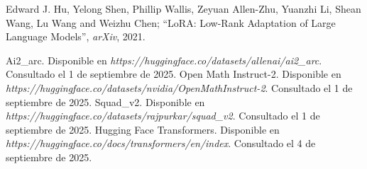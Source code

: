 \documentclass[11pt,a4paper]{article}
\begin{document}
\begin{thebibliography}{99}

 Edward J. Hu, Yelong Shen, Phillip Wallis, Zeyuan Allen-Zhu, Yuanzhi Li, Shean Wang, Lu Wang and Weizhu Chen; ``LoRA: Low-Rank Adaptation of Large Language Models'', {\it arXiv}, 2021.

 Ai2\_arc. Disponible en {\it https://huggingface.co/datasets/allenai/ai2\_arc}. Consultado el 1 de septiembre de 2025.
 Open Math Instruct-2. Disponible en {\it https://huggingface.co/datasets/nvidia/OpenMathInstruct-2}. Consultado el 1 de septiembre de 2025.
 Squad\_v2. Disponible en {\it https://huggingface.co/datasets/rajpurkar/squad\_v2}. Consultado el 1 de septiembre de 2025.
 Hugging Face Transformers. Disponible en {\it https://huggingface.co/docs/transformers/en/index}. Consultado el 4 de septiembre de 2025.

\end{thebibliography}
\end{document}
